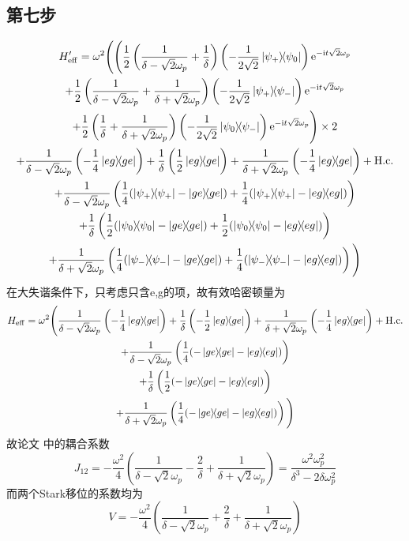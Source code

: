 \documentclass[
fontsetup = font-setup-open.tex,
titlesetup = titles-setup.tex
]{AJbook}
\numberwithin{equation}{section}
\begin{document}
\subsection{第七步}
\begin{multline}
H_{\mathrm{eff}}'=\omega^2\Bigg(\Bigg(\frac{1}{2}\left(\frac{1}{\delta-\sqrt{2}\omega_p}+\frac{1}{\delta}\right)\left(-\frac{1}{2\sqrt{2}}\ketbra{\psi_+}{\psi_0}\right)\mathrm{e}^{-\mathrm{i}t \sqrt{2}\omega_p}\\
+\frac{1}{2}\left(\frac{1}{\delta-\sqrt{2}\omega_p}+\frac{1}{\delta+\sqrt{2}\omega_p}\right)\left(-\frac{1}{2\sqrt{2}}\ketbra{\psi_+}{\psi_-}\right)\mathrm{e}^{-\mathrm{i}t \sqrt{2}\omega_p}\\
+\frac{1}{2}\left(\frac{1}{\delta}+\frac{1}{\delta+\sqrt{2}\omega_p}\right)\left(-\frac{1}{2\sqrt{2}}\ketbra{\psi_0}{\psi_-}\right)\mathrm{e}^{-\mathrm{i}t \sqrt{2}\omega_p}\Bigg)\times 2\\
+\frac{1}{\delta-\sqrt{2}\omega_p}\left(-\frac{1}{4}\ketbra{eg}{ge}\right)+\frac{1}{\delta}\left(\frac{1}{2}\ketbra{eg}{ge}\right)+\frac{1}{\delta+\sqrt{2}\omega_p}\left(-\frac{1}{4}\ketbra{eg}{ge}\right)+\mathrm{H.c.}\\
+\frac{1}{\delta-\sqrt{2}\omega_p}\left(\frac{1}{4}(\ketbra{\psi_+}{\psi_+}-\ketbra{ge}{ge})+\frac{1}{4}(\ketbra{\psi_+}{\psi_+}-\ketbra{eg}{eg})\right)\\
+\frac{1}{\delta}\left(\frac{1}{2}(\ketbra{\psi_0}{\psi_0}-\ketbra{ge}{ge})+\frac{1}{2}(\ketbra{\psi_0}{\psi_0}-\ketbra{eg}{eg})\right)\\
+\frac{1}{\delta+\sqrt{2}\omega_p}\left(\frac{1}{4}(\ketbra{\psi_-}{\psi_-}-\ketbra{ge}{ge})+\frac{1}{4}(\ketbra{\psi_-}{\psi_-}-\ketbra{eg}{eg})\right)\Bigg)
\end{multline}
在大失谐条件下，只考虑只含e,g的项，故有效哈密顿量为
\begin{multline}
H_{\mathrm{eff}}=\omega^2\Bigg(\frac{1}{\delta-\sqrt{2}\omega_p}\left(-\frac{1}{4}\ketbra{eg}{ge}\right)+\frac{1}{\delta}\left(-\frac{1}{2}\ketbra{eg}{ge}\right)+\frac{1}{\delta+\sqrt{2}\omega_p}\left(-\frac{1}{4}\ketbra{eg}{ge}\right)+\mathrm{H.c.}\\
+\frac{1}{\delta-\sqrt{2}\omega_p}\left(\frac{1}{4}(-\ketbra{ge}{ge}-\ketbra{eg}{eg})\right)\\
+\frac{1}{\delta}\left(\frac{1}{2}(-\ketbra{ge}{ge}-\ketbra{eg}{eg})\right)\\
+\frac{1}{\delta+\sqrt{2}\omega_p}\left(\frac{1}{4}(-\ketbra{ge}{ge}-\ketbra{eg}{eg})\right)\Bigg)
\end{multline}
故论文 \cite{PhysRevA.105.032417} 中的耦合系数
\begin{equation}\label{key}
J_{12}=-\frac{\omega^2}{4}\left(\frac{1}{\delta-\sqrt{2}\omega_p}-\frac{2}{\delta}+\frac{1}{\delta+\sqrt{2}\omega_p}\right)=\frac{\omega^2\omega_p^2}{\delta^3-2\delta\omega_p^2}
\end{equation}
而两个Stark移位的系数均为
\begin{equation}\label{key}
V=-\frac{\omega^2}{4}\left(\frac{1}{\delta-\sqrt{2}\omega_p}+\frac{2}{\delta}+\frac{1}{\delta+\sqrt{2}\omega_p}\right)
\end{equation}
\end{document}
